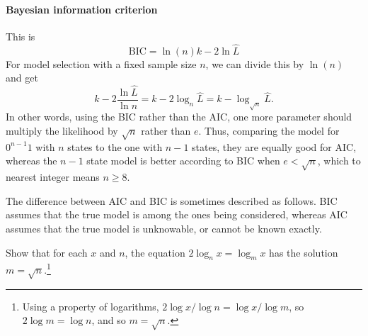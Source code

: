 		\paragraph{Bayesian information criterion} This  is
		\[
			\mathrm{BIC} = \ln(n)k-2 \ln\hat L
		\]
		For model selection with a fixed sample size $n$, we can divide this by $\ln(n)$ and get
		\[
			k - 2\frac{\ln\hat L}{\ln n} = k - 2\log_n\hat L = k-\log_{\sqrt n}\hat L.
		\]
		In other words, using the BIC rather than the AIC, one more parameter should multiply the likelihood by $\sqrt n$ rather than $e$. Thus, comparing the model for $0^{n-1}1$ with $n$ states to the one with $n-1$ states, they are equally good for AIC, whereas the $n-1$ state model is better according to BIC when $e<\sqrt n$, which to nearest integer means $n\ge 8$.
		
		The difference between AIC and BIC is sometimes described as follows. BIC assumes that the true model is among the ones being considered, whereas AIC assumes that the true model is unknowable, or cannot be known exactly.
		\begin{exercise}
			Show that for each $x$ and $n$, the equation $2\log_n x = \log_m x$ has the solution $m=\sqrt{n}$.\footnote{Using a property of logarithms, $2\log x/\log n = \log x/\log m$, so $2\log m = \log n$, and so $m = \sqrt{n}$.}
		\end{exercise}


